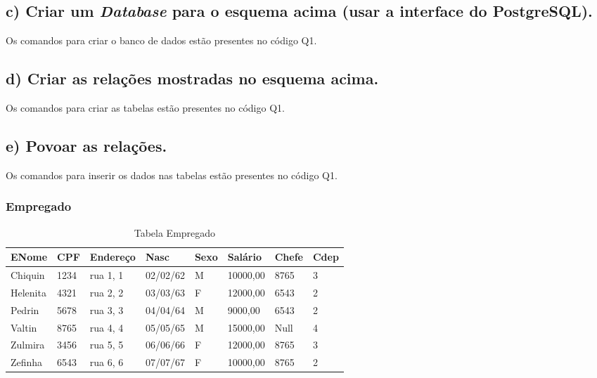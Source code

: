 \documentclass[a4paper,12pt]{article}
\begin{document}
\subsection*{c) Criar um \textit{Database} para o esquema acima (usar a interface do PostgreSQL).}
Os comandos para criar o banco de dados estão presentes no código Q1.

\subsection*{d) Criar as relações mostradas no esquema acima.}
Os comandos para criar as tabelas estão presentes no código Q1.

\subsection*{e) Povoar as relações.}
Os comandos para inserir os dados nas tabelas estão presentes no código Q1.

\subsubsection*{Empregado}
\begin{table}[h]
\centering
\caption{Tabela Empregado}
\begin{tabular}{|l|l|l|l|l|l|l|l|}
\hline
\textbf{ENome}   & \textbf{CPF} & \textbf{Endereço} & \textbf{Nasc}   & \textbf{Sexo} & \textbf{Salário} & \textbf{Chefe} & \textbf{Cdep} \\ \hline
Chiquin          & 1234         & rua 1, 1          & 02/02/62        & M             & 10000,00       & 8765          & 3            \\ \hline
Helenita         & 4321         & rua 2, 2          & 03/03/63        & F             & 12000,00       & 6543          & 2            \\ \hline
Pedrin           & 5678         & rua 3, 3          & 04/04/64        & M             & 9000,00        & 6543          & 2            \\ \hline
Valtin           & 8765         & rua 4, 4          & 05/05/65        & M             & 15000,00       & Null          & 4            \\ \hline
Zulmira          & 3456         & rua 5, 5          & 06/06/66        & F             & 12000,00       & 8765          & 3            \\ \hline
Zefinha          & 6543         & rua 6, 6          & 07/07/67        & F             & 10000,00       & 8765          & 2            \\ \hline
\end{tabular}
\end{table}
\end{document}
